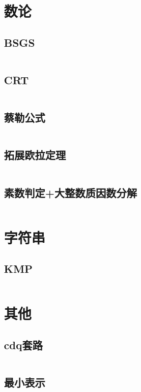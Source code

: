 \documentclass{article}
\begin{document}
\section{数论}
\subsection{BSGS}
\inputminted[breaklines]{c++}{../数论/BSGS.cpp}

\subsection{CRT}
\inputminted[breaklines]{c++}{../数论/CRT.cpp}

\subsection{蔡勒公式}
\inputminted[breaklines]{c++}{../数论/蔡勒公式.cpp}

\subsection{拓展欧拉定理}
\inputminted[breaklines]{c++}{../数论/拓展欧拉定理.cpp}

\subsection{素数判定+大整数质因数分解}
\inputminted[breaklines]{c++}{../数论/素数判定+大整数质因数分解.cpp}

\newpage
\section{字符串}
\subsection{KMP}
\inputminted[breaklines]{c++}{../字符串/KMP.cpp}

\newpage
\section{其他}

\subsection{cdq套路}
\inputminted[breaklines]{text}{../其他/cdq.cpp}

\subsection{最小表示}
\inputminted[breaklines]{c++}{../其他/最小表示.cpp}
\end{document}
